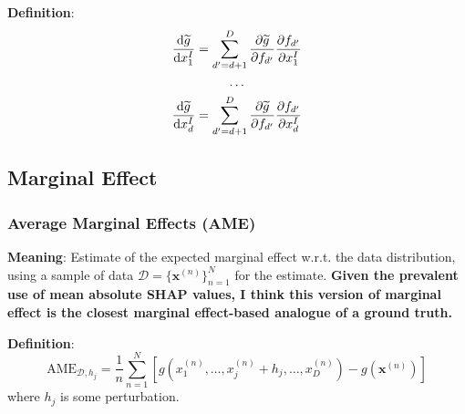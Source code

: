 \documentclass{article}
\theoremstyle{definition}
\begin{document}
        \bigskip

        \textbf{Definition}:
        \begin{gather*}
            \dv{\widetilde{g}}{x_1^I} = \sum_{d'=d+1}^D \pdv{\widetilde{g}}{f_{d'}} \pdv{f_{d'}}{x_1^I} \\
            \ldots \\
            \dv{\widetilde{g}}{x_d^I} = \sum_{d'=d+1}^D \pdv{\widetilde{g}}{f_{d'}} \pdv{f_{d'}}{x_d^I} \\
        \end{gather*}
    



    \subsection{Marginal Effect}
        \subsubsection{Average Marginal Effects (AME)}
        \textbf{Meaning}: Estimate of the expected marginal effect w.r.t. the data distribution, using a sample of data $\mathcal{D} = \{\mathbf{x}^{(n)}\}_{n=1}^N$ for the estimate. \textbf{Given the prevalent use of mean absolute SHAP values, I think this version of marginal effect is the closest marginal effect-based analogue of a ground truth.}

        \bigskip

        \textbf{Definition}: 
        \begin{equation*}
            \text{AME}_{\mathcal{D},h_j} = \frac{1}{n}\sum_{n=1}^N \left[ g(x_1^{(n)},\ldots,x_j^{(n)} + h_j,\ldots,x_D^{(n)}) - g(\mathbf{x}^{(n)}) \right]
        \end{equation*}
        where $h_j$ is some perturbation.
    
\end{document}
